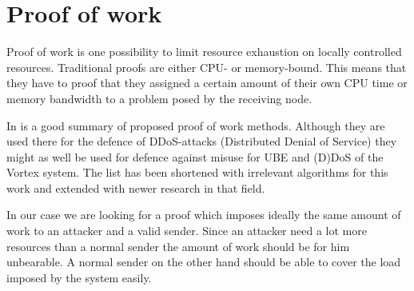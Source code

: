 \section{Proof of work}
Proof of work is one possibility to limit resource exhaustion on locally controlled resources. Traditional proofs are either CPU- or memory-bound. This means that they have to proof that they assigned a certain amount of their own CPU time or memory bandwidth to a problem posed by the receiving node.

In \cite{amiri2015theoretical} is a good summary of proposed proof of work methods. Although they are used there for the defence of DDoS-attacks (Distributed Denial of Service) they might as well be used for defence against misuse for UBE and (D)DoS of the Vortex system. The list has been shortened with irrelevant algorithms for this work and extended with newer research in that field.

In our case we are looking for a proof which imposes ideally the same amount of work to an attacker and a valid sender. Since an attacker need a lot more resources than a normal sender the amount of work should be for him unbearable. A normal sender on the other hand should be able to cover the load imposed by the system easily.

